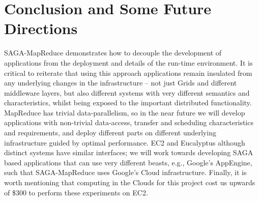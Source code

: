 \documentclass[conference,final]{IEEEtran}
\newcommand{\sagamapreduce }{SAGA-MapReduce }
\begin{document}
\section{Conclusion and Some Future Directions}



\sagamapreduce demonstrates how to decouple the development of
applications from the deployment and details of the run-time
environment.  It is critical to reiterate that using this approach
applications remain insulated from any underlying changes in the
infrastructure -- not just Grids and different middleware layers, but
also different systems with very different semantics and
characteristics, whilst being exposed to the important distributed
functionality. %
MapReduce has trivial data-parallelism, so in the near future we will
develop applications with non-trivial data-access, transfer and
scheduling characteristics and requirements, and deploy different
parts on different underlying infrastructure guided by optimal
performance.  EC2 and Eucalyptus although distinct systems have
similar interfaces; we will work towards developing SAGA based
applications that can use very different beasts, e.g., Google's
AppEngine, such that \sagamapreduce uses Google's Cloud
infrastructure.  Finally, it is worth mentioning that computing in the
Clouds for this project cost us upwards of \$300 to perform these
experiments on EC2.




\end{document}
